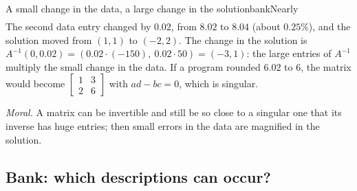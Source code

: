 \documentclass[11pt]{article}
\begin{document}
\begin{exmp}{A small change in the data, a large change in the solution}{bankNearly}
\begin{align*}
\end{align*}
The second data entry changed by $0.02$, from $8.02$ to $8.04$ (about $0.25\%$), and the solution moved from $(1,1)$ to $(-2,2)$. The change in the solution is $A^{-1}(0,0.02)=(0.02\cdot(-150),\ 0.02\cdot50)=(-3,1)$: the large entries of $A^{-1}$ multiply the small change in the data. If a program rounded $6.02$ to $6$, the matrix would become $\begin{bmatrix}1&3\\2&6\end{bmatrix}$ with $ad-bc=0$, which is singular.

\emph{Moral.} A matrix can be invertible and still be so close to a singular one that its inverse has huge entries; then small errors in the data are magnified in the solution.
\end{exmp}

\subsection*{Bank: which descriptions can occur?}
\end{document}
